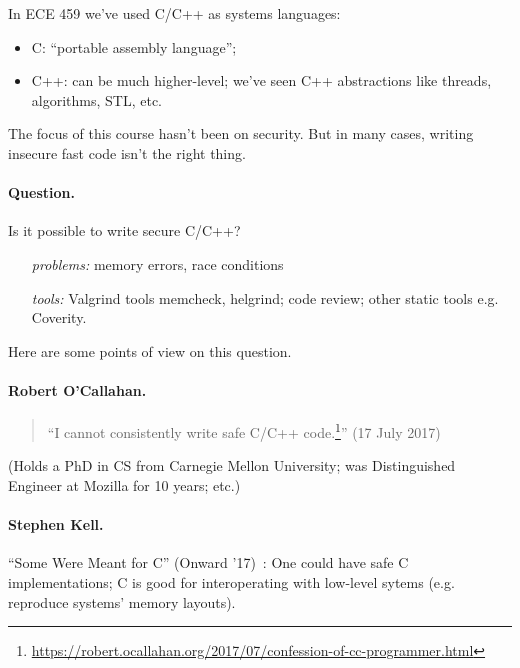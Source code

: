 




In ECE 459 we've used C/C++ as systems languages:
\vspace*{-1.5em}
\begin{itemize}[noitemsep]
\item C: ``portable assembly language'';
\item C++: can be much higher-level; we've seen C++ abstractions like threads, algorithms, STL, etc.
\end{itemize}
The focus of this course hasn't been on security. But in many cases, writing insecure fast code
isn't the right thing.

\paragraph{Question.} Is it possible to write secure C/C++?
\vspace*{-1.5em}
\begin{itemize}[noitemsep]
\item[\emph{problems:}] memory errors, race conditions
\item[\emph{tools:}] Valgrind tools memcheck, helgrind; code review; other static tools e.g. Coverity.
\end{itemize}

Here are some points of view on this question.

\paragraph{Robert O'Callahan.}
\begin{quote}
\vspace*{-1.5em}
``I cannot consistently write safe C/C++ code.\footnote{\url{https://robert.ocallahan.org/2017/07/confession-of-cc-programmer.html}}'' (17 July 2017)
\end{quote}
\vspace*{-1em}
(Holds a PhD in CS from Carnegie Mellon University; was Distinguished Engineer
at Mozilla for 10 years; etc.)

\paragraph{Stephen Kell.} ``Some Were Meant for C'' (Onward '17)~\cite{Kell:2017:MCE:3133850.3133867}: One could have safe C implementations;
C is good for interoperating with low-level sytems (e.g. reproduce systems' memory layouts).


